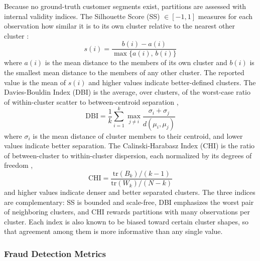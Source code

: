\documentclass[conference]{IEEEtran}
\begin{document}
Because no ground-truth customer segments exist, partitions are assessed with internal validity indices. The Silhouette Score (SS) $\in [-1, 1]$ measures for each observation how similar it is to its own cluster relative to the nearest other cluster \cite{rousseeuw1987silhouettes}:
\begin{equation}
    s(i) = \frac{b(i) - a(i)}{\max\{a(i),\, b(i)\}}
\end{equation}
where $a(i)$ is the mean distance to the members of its own cluster and $b(i)$ is the smallest mean distance to the members of any other cluster. The reported value is the mean of $s(i)$ and higher values indicate better-defined clusters. The Davies-Bouldin Index (DBI) is the average, over clusters, of the worst-case ratio of within-cluster scatter to between-centroid separation \cite{davies1979cluster},
\begin{equation}
    \mathrm{DBI} = \frac{1}{k}\sum_{i=1}^{k}\max_{j\neq i}\frac{\sigma_i+\sigma_j}{d(\mu_i,\mu_j)}
\end{equation}
where $\sigma_i$ is the mean distance of cluster members to their centroid, and lower values indicate better separation. The Calinski-Harabasz Index (CHI) is the ratio of between-cluster to within-cluster dispersion, each normalized by its degrees of freedom \cite{calinski1974dendrite},
\begin{equation}
    \mathrm{CHI} = \frac{\mathrm{tr}(B_k)/(k-1)}{\mathrm{tr}(W_k)/(N-k)}
\end{equation}
and higher values indicate denser and better separated clusters. The three indices are complementary: SS is bounded and scale-free, DBI emphasizes the worst pair of neighboring clusters, and CHI rewards partitions with many observations per cluster. Each index is also known to be biased toward certain cluster shapes, so that agreement among them is more informative than any single value.

\subsubsection{Fraud Detection Metrics}
\end{document}
